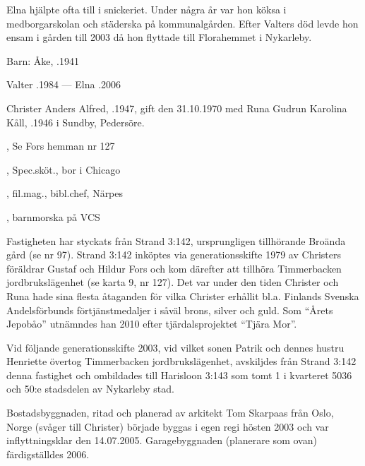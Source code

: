 Elna hjälpte ofta till i snickeriet. Under några år var hon köksa i medborgarskolan och städerska på kommunalgården. Efter Valters död levde hon ensam i gården till 2003 då hon flyttade till Florahemmet i Nykarleby.

Barn: Åke, .1941

Valter .1984  ---  Elna .2006



%



%
Christer Anders Alfred, .1947, gift den 31.10.1970 med Runa Gudrun Karolina Kåll, .1946 i Sundby, Pedersöre.
\begin{jhchildren}
  \item {}, Se Fors hemman nr 127
  \item {}, Spec.sköt., bor i Chicago
  \item {}, fil.mag., bibl.chef, Närpes
  \item {}, barnmorska på VCS
\end{jhchildren}
Fastigheten har styckats från Strand 3:142, ursprungligen tillhörande Broända gård (se nr 97). Strand 3:142 inköptes via generationsskifte 1979 av Christers föräldrar Gustaf och Hildur Fors och kom därefter att tillhöra Timmerbacken jordbrukslägenhet (se karta 9, nr 127). Det var under den tiden Christer och Runa hade sina flesta åtaganden för vilka Christer erhållit bl.a. Finlands Svenska Andelsförbunds förtjänstmedaljer i såväl brons, silver och guld. Som ``Årets Jepobåo'' utnämndes han 2010 efter tjärdalsprojektet ``Tjära Mor''.

Vid följande generationsskifte 2003, vid vilket sonen Patrik och dennes hustru Henriette övertog Timmerbacken jordbrukslägenhet, avskiljdes från Strand 3:142 denna fastighet och ombildades till	Harisloon 3:143 som tomt 1 i kvarteret 5036 och 50:e stadsdelen av	Nykarleby stad.

Bostadsbyggnaden, ritad och planerad av arkitekt Tom Skarpaas	från Oslo, Norge (svåger till Christer) började byggas i egen regi hösten 2003 och var inflyttningsklar den 14.07.2005. Garagebyggnaden (planerare som ovan) färdigställdes 2006.

